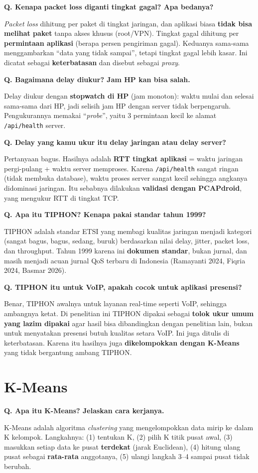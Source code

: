 \documentclass[11pt,a4paper]{article}
\newcounter{q}
\newcommand{\tanya}[2]{\stepcounter{q}%
\par\vspace{6pt}\noindent\colorbox{band}{\parbox{\dimexpr\linewidth-2\fboxsep}{\textbf{Q\arabic{q}. #1}}}\par\vspace{2pt}#2\par}
\begin{document}
\tanya{Kenapa packet loss diganti tingkat gagal? Apa bedanya?}{\textit{Packet loss} dihitung per paket di tingkat jaringan, dan aplikasi biasa \textbf{tidak bisa melihat paket} tanpa akses khusus (root/VPN). Tingkat gagal dihitung per \textbf{permintaan aplikasi} (berapa persen pengiriman gagal). Keduanya sama-sama menggambarkan ``data yang tidak sampai'', tetapi tingkat gagal lebih kasar. Ini dicatat sebagai \textbf{keterbatasan} dan disebut sebagai \textit{proxy}.}

\tanya{Bagaimana delay diukur? Jam HP kan bisa salah.}{Delay diukur dengan \textbf{stopwatch di HP} (jam monoton): waktu mulai dan selesai sama-sama dari HP, jadi selisih jam HP dengan server tidak berpengaruh. Pengukurannya memakai ``\textit{probe}'', yaitu 3 permintaan kecil ke alamat \texttt{/api/health} server.}

\tanya{Delay yang kamu ukur itu delay jaringan atau delay server?}{Pertanyaan bagus. Hasilnya adalah \textbf{RTT tingkat aplikasi} = waktu jaringan pergi-pulang + waktu server memproses. Karena \texttt{/api/health} sangat ringan (tidak membuka database), waktu proses server sangat kecil sehingga angkanya didominasi jaringan. Itu sebabnya dilakukan \textbf{validasi dengan PCAPdroid}, yang mengukur RTT di tingkat TCP.}

\tanya{Apa itu TIPHON? Kenapa pakai standar tahun 1999?}{TIPHON adalah standar ETSI yang membagi kualitas jaringan menjadi kategori (sangat bagus, bagus, sedang, buruk) berdasarkan nilai delay, jitter, packet loss, dan throughput. Tahun 1999 karena ini \textbf{dokumen standar}, bukan jurnal, dan masih menjadi acuan jurnal QoS terbaru di Indonesia (Ramayanti 2024, Fiqria 2024, Basmar 2026).}

\tanya{TIPHON itu untuk VoIP, apakah cocok untuk aplikasi presensi?}{Benar, TIPHON awalnya untuk layanan real-time seperti VoIP, sehingga ambangnya ketat. Di penelitian ini TIPHON dipakai sebagai \textbf{tolok ukur umum yang lazim dipakai} agar hasil bisa dibandingkan dengan penelitian lain, bukan untuk menyatakan presensi butuh kualitas setara VoIP. Ini juga ditulis di keterbatasan. Karena itu hasilnya juga \textbf{dikelompokkan dengan K-Means} yang tidak bergantung ambang TIPHON.}

\section{K-Means}

\tanya{Apa itu K-Means? Jelaskan cara kerjanya.}{K-Means adalah algoritma \textit{clustering} yang mengelompokkan data mirip ke dalam K kelompok. Langkahnya: (1) tentukan K, (2) pilih K titik pusat awal, (3) masukkan setiap data ke pusat \textbf{terdekat} (jarak Euclidean), (4) hitung ulang pusat sebagai \textbf{rata-rata} anggotanya, (5) ulangi langkah 3--4 sampai pusat tidak berubah.}
\end{document}
